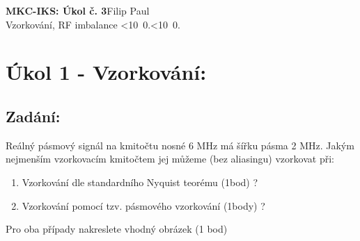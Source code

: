 \documentclass[10pt, a4paper]{article}%
\def\mydate{\leavevmode\hbox{\twodigits\day.\twodigits\month.\the\year}}
\def\twodigits#1{\ifnum#1<10 0\fi\the#1}
\begin{document}
\begin{flushleft}%
	\textbf{\Large{MKC-IKS: Úkol č. 3}}\hfill Filip Paul\\
	\large{Vzorkování, RF imbalance \hfill\mydate}
\end{flushleft}
	\section*{\Large Úkol 1 - Vzorkování:}
        \subsection*{Zadání:}
           Reálný pásmový signál na kmitočtu nosné 6 MHz má šířku pásma 2 MHz.
           Jakým nejmenším vzorkovacím kmitočtem jej můžeme (bez aliasingu) vzorkovat při:
           \begin{enumerate}
            \item	Vzorkování dle standardního Nyquist teorému (1bod) ?
            \item	Vzorkování pomocí tzv. pásmového vzorkování (1body) ?
            \end{enumerate}
            Pro oba případy nakreslete vhodný obrázek (1 bod)
\end{document}
